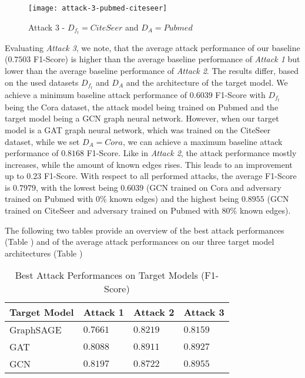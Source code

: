             \begin{figure}[h]
                \begin{center}
                    \texttt{[image: attack-3-pubmed-citeseer]}
                    \caption{Attack 3 - $D_{f_t} = CiteSeer$ and $D_A = Pubmed$}
                    \label{figure:eval-att3-pubmed-citeseer}
                \end{center}
            \end{figure}

            Evaluating \emph{Attack 3}, we note, that the average attack performance of our baseline ($0.7503$ F1-Score) is higher than the average baseline performance of \emph{Attack 1} but lower than the average baseline performance of \emph{Attack 2}.
            The results differ, based on the used datasets $D_{f_t}$ and $D_A$ and the architecture of the target model.
            We achieve a minimum baseline attack performance of $0.6039$ F1-Score with $D_{f_t}$ being the Cora dataset, the attack model being trained on Pubmed and the target model being a GCN graph neural network.
            However, when our target model is a GAT graph neural network, which was trained on the CiteSeer dataset, while we set $D_A = Cora$, we can achieve a maximum baseline attack performance of $0.8168$ F1-Score.  
            Like in \emph{Attack 2}, the attack performance mostly increases, while the amount of known edges rises.
            This leads to an improvement up to $0.23$ F1-Score.
            With respect to all performed attacks, the average F1-Score is $0.7979$, with the lowest being $0.6039$ (GCN trained on Cora and adversary trained on Pubmed with 0\% known edges) and the highest being $0.8955$ (GCN trained on CiteSeer and adversary trained on Pubmed with 80\% known edges).
        
        The following two tables provide an overview of the best attack performances (Table ) and of the average attack performances on our three target model architectures (Table )

        \vspace{0.48cm}
        \begin{table}[!h]
            \centering
            \footnotesize
            \begin{tabular}{l|l|l|l|}
              \toprule
              Target Model & Attack 1 & Attack 2 & Attack 3 \\
              \midrule
              GraphSAGE & $0.7661$ & $0.8219$ & $0.8159$ \\
              GAT & $0.8088$ & $0.8911$ & $0.8927$ \\
              GCN & $0.8197$ & $0.8722$ & $0.8955$ \\
            
              \bottomrule
            \end{tabular}
            \caption{Best Attack Performances on Target Models (F1-Score)}
            \label{table:attack-best-results-all}
          \end{table}
        

